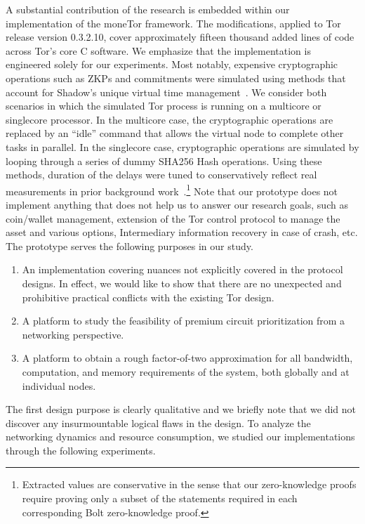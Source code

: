 A substantial contribution of the research is embedded within our implementation
of the moneTor framework. The modifications, applied to Tor release version
0.3.2.10, cover approximately fifteen thousand added lines of code across Tor's
core C software. We emphasize that the implementation is engineered solely for
our experiments. Most notably, expensive cryptographic operations such as ZKPs
and commitments were simulated using methods that account for Shadow's unique
virtual time management~\cite{jansen2011shadow}. We consider both scenarios in
which the simulated Tor process is running on a multicore or singlecore
processor. In the multicore case, the cryptographic operations are replaced by
an ``idle'' command that allows the virtual node to complete other tasks in
parallel. In the singlecore case, cryptographic operations are simulated by
looping through a series of dummy SHA256 Hash operations.
Using these methods, duration of the delays were tuned to conservatively reflect
real measurements in prior background
work~\cite{green2017bolt}.\footnote{Extracted values are conservative in the
  sense that our zero-knowledge proofs require proving only a subset of the
  statements required in each corresponding Bolt zero-knowledge proof.} Note
that our prototype does not implement anything that does not help us to answer
our research goals, such as coin/wallet management, extension of the Tor control
protocol to manage the asset and various options, Intermediary information
recovery in case of crash, etc. The prototype serves the following purposes in
our study.
\begin{enumerate}
\item An implementation covering nuances not explicitly covered in the protocol
  designs. In effect, we would like to show that there are no unexpected and
  prohibitive practical conflicts with the existing Tor design.
\item A platform to study the feasibility of premium circuit prioritization from
  a networking perspective.
\item A platform to obtain a rough factor-of-two approximation for all
  bandwidth, computation, and memory requirements of the system, both globally
  and at individual nodes.
\end{enumerate}

The first design purpose is clearly qualitative and we briefly note that we did
not discover any insurmountable logical flaws in the design. To analyze the
networking dynamics and resource consumption, we studied our implementations
through the following experiments.

